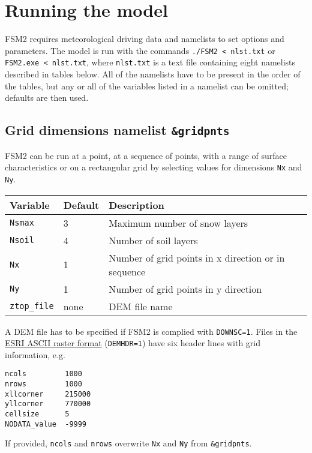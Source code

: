 \documentclass{article}
\begin{document}
\section{Running the model}

FSM2 requires meteorological driving data and namelists to set options and parameters. The model is run with the commands {\tt ./FSM2 < nlst.txt} or {\tt FSM2.exe < nlst.txt}, where {\tt nlst.txt} is a text file containing eight namelists described in tables below. All of the namelists have to be present in the order of the tables, but any or all of the variables listed in a namelist can be omitted; defaults are then used.


\subsection{Grid dimensions namelist {\tt \&gridpnts}}
FSM2 can be run at a point, at a sequence of points, with a range of surface characteristics or on a rectangular grid by selecting values for dimensions {\tt Nx} and {\tt Ny}. 

\begin{longtable}{|l|l|l|}
\hline
Variable & Default & Description \\
\hline
{\tt Nsmax}      & 3    & Maximum number of snow layers                       \\
{\tt Nsoil}      & 4    & Number of soil layers                               \\
{\tt Nx}         & 1    & Number of grid points in x direction or in sequence \\
{\tt Ny}         & 1    & Number of grid points in y direction                \\
{\tt ztop\_file} & none & DEM file name                                       \\
\hline
\end{longtable}

A DEM file has to be specified if FSM2 is complied with {\tt DOWNSC=1}. Files in the \href{http://resources.esri.com/help/9.3/arcgisdesktop/com/gp_toolref/spatial_analyst_tools/esri_ascii_raster_format.htm}{ESRI ASCII raster format} ({\tt DEMHDR=1}) have six header lines with grid information, e.g.
{\tt\begin{verbatim}
ncols         1000
nrows         1000
xllcorner     215000
yllcorner     770000
cellsize      5
NODATA_value  -9999
\end{verbatim}}
If provided, {\tt ncols} and {\tt nrows} overwrite {\tt Nx} and {\tt Ny} from {\tt \&gridpnts}.
\end{document}
